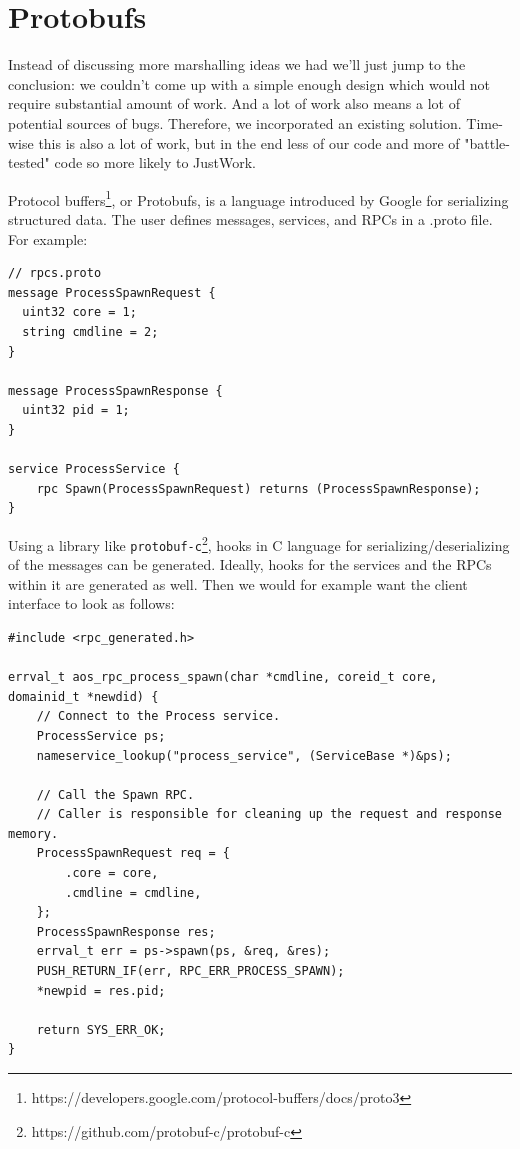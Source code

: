 \section{Protobufs}
Instead of discussing more marshalling ideas we had we'll just jump to the conclusion: we couldn't come up with a simple enough design which would not require substantial amount of work. And a lot of work also means a lot of potential sources of bugs. Therefore, we incorporated an existing solution. Time-wise this is also a lot of work, but in the end less of our code and more of "battle-tested" code so more likely to JustWork\texttrademark.

Protocol buffers\footnote{https://developers.google.com/protocol-buffers/docs/proto3}, or Protobufs, is a language introduced by Google for serializing structured data. The user defines messages, services, and RPCs in a .proto file. For example:
\begin{verbatim}
// rpcs.proto
message ProcessSpawnRequest {
  uint32 core = 1;
  string cmdline = 2;
}

message ProcessSpawnResponse {
  uint32 pid = 1;
}

service ProcessService {
    rpc Spawn(ProcessSpawnRequest) returns (ProcessSpawnResponse);
}
\end{verbatim}

Using a library like \texttt{protobuf-c}\footnote{https://github.com/protobuf-c/protobuf-c}, hooks in C language for serializing/deserializing of the messages can be generated. Ideally, hooks for the services and the RPCs within it are generated as well. Then we would for example want the client interface to look as follows:
\begin{verbatim}
#include <rpc_generated.h>

errval_t aos_rpc_process_spawn(char *cmdline, coreid_t core, domainid_t *newdid) {
    // Connect to the Process service.
    ProcessService ps;
    nameservice_lookup("process_service", (ServiceBase *)&ps);
    
    // Call the Spawn RPC.
    // Caller is responsible for cleaning up the request and response memory.
    ProcessSpawnRequest req = {
        .core = core,
        .cmdline = cmdline,
    };
    ProcessSpawnResponse res;
    errval_t err = ps->spawn(ps, &req, &res);
    PUSH_RETURN_IF(err, RPC_ERR_PROCESS_SPAWN);
    *newpid = res.pid;

    return SYS_ERR_OK;
}
\end{verbatim}


